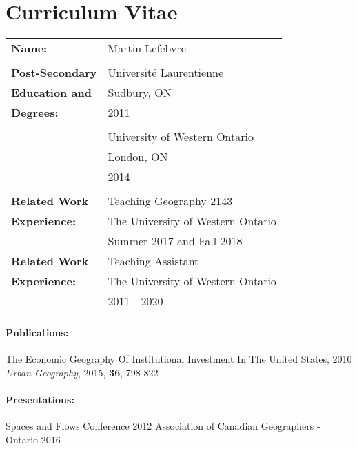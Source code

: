 \documentclass[12pt,letterpaper]{book}
\numberwithin{figure}{chapter}
\newcommand{\firstname}{Martin}
\newcommand{\lastname}{Lefebvre}
\begin{document}
\chapter*{Curriculum Vitae}
\begin{table}[ht]
\begin{tabular}{ll}
\textbf{Name:} & \firstname{} \lastname\\\\
\textbf{Post-Secondary} & Universit\'{e} Laurentienne\\
\textbf{Education and}& Sudbury, ON\\
\textbf{Degrees:}& 2011\\\\
& University of Western Ontario\\
& London, ON\\
& 2014 \\\\
\textbf{Related Work}& Teaching Geography 2143\\
\textbf{Experience:}& The University of Western Ontario\\
& Summer 2017 and Fall 2018\\

\textbf{Related Work}& Teaching Assistant\\
\textbf{Experience:}& The University of Western Ontario\\
& 2011 - 2020\\
\end{tabular}
\end{table}
\subsubsection*{Publications:}
The Economic Geography Of Institutional Investment In The United States, 2010 
\textit{Urban Geography}, 2015, \textbf{36}, 798-822 

\subsubsection*{Presentations:}
Spaces and Flows Conference 2012 \newline
Association of Canadian Geographers - Ontario 2016
\end{document}
